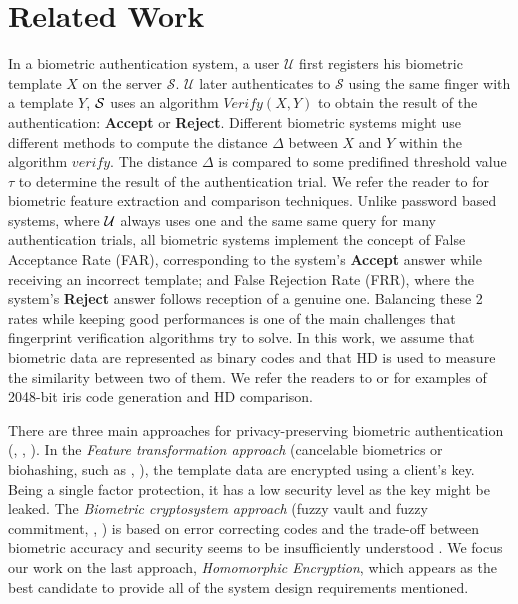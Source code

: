 \section{Related Work}
\label{sec:iscRelatedWor}
In a biometric authentication system, a user $\mathcal{U}$ first registers his
biometric template $X$ on the server $\mathcal{S}$. $\mathcal{U}$ later
authenticates to $\mathcal{S}$ using the same finger with a template $Y$,
$\mathcal{S}$ uses an algorithm $Verify(X,Y)$ to obtain the result of the
authentication: \textbf{Accept} or \textbf{Reject}. Different biometric systems
might use different methods to compute the distance $\Delta$ between $X$ and $Y$
within the algorithm $verify$. The distance $\Delta$ is compared to some
predifined threshold value $\tau$ to determine the result of the authentication
trial. We refer the reader to \cite{jain2007handbook} for biometric feature
extraction and comparison techniques. Unlike password based systems, where
$\mathcal{U}$ always uses one and the same same query for many authentication trials,
all biometric systems implement the concept of False Acceptance Rate (FAR),
corresponding to the system's \textbf{Accept} answer while receiving an
incorrect template; and False Rejection Rate (FRR), where the system's
\textbf{Reject} answer follows reception of a genuine one.  Balancing these 2
rates while keeping good performances is one of the main challenges that
fingerprint verification algorithms \cite{FVConGoi2:online} try to solve. In
this work, we assume that biometric data are represented as binary codes and
that HD is used to measure the similarity between two of them. We refer the
readers to \cite{daugman2003importance} or \cite{FujitsuD7:online} for examples
of 2048-bit iris code generation and HD comparison.

There are three main approaches for privacy-preserving biometric authentication
(\cite{jain201650}, \cite{belguechi2011overview}, \cite{jain2008biometric}). In
the \emph{Feature transformation approach} (cancelable biometrics or biohashing,
such as \cite{teoh2008cancellable}, \cite{cappelli2010minutia}), the template
data are encrypted using a client's key. Being a single factor protection, it
has a low security level as the key might be leaked. The \emph{Biometric
  cryptosystem approach} (fuzzy vault and fuzzy commitment,
\cite{uludag2004biometric}, \cite{nagar2010hybrid}) is based on error correcting
codes and the trade-off between biometric accuracy and security seems to be
insufficiently understood . We focus our work on the last approach,
\emph{Homomorphic Encryption}, which appears as the best candidate to provide
all of the system design requirements mentioned.

